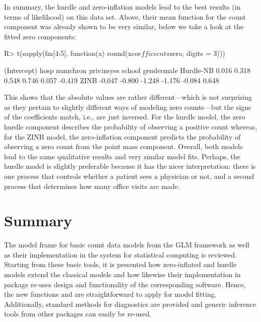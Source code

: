 \documentclass{Z}
\newcommand{\fct}[1]{\code{#1()}}
\begin{document}
In summary, the hurdle and zero-inflation models lead to the best 
results (in terms of likelihood) on this data set. Above, their mean function for the
count component was already shown to be very similar, below we take a
look at the fitted zero components:
\begin{Schunk}
\begin{Sinput}
R> t(sapply(fm[4:5], function(x) round(x$coefficients$zero, digits = 3)))
\end{Sinput}
\begin{Soutput}
          (Intercept)   hosp numchron privinsyes school gendermale
Hurdle-NB       0.016  0.318    0.548      0.746  0.057     -0.419
ZINB           -0.047 -0.800   -1.248     -1.176 -0.084      0.648
\end{Soutput}
\end{Schunk}
This shows that the absolute values are rather different---which is not
surprising as they pertain to slightly different ways of modeling zero
counts---but the signs of the coefficients match, i.e., are just inversed.
For the hurdle model, the zero hurdle component describes the probability
of observing a positive count whereas, for the ZINB model, the zero-inflation
component predicts the probability of observing a zero count from the
point mass component. Overall, both models lead to the same qualitative
results and very similar model fits. Perhaps, the hurdle model is slightly
preferable because it has the nicer interpretation: there is one process
that controls whether a patient sees a physician or not, and a second 
process that determines how many office visits are made.

\section{Summary} \label{sec:summary}

The model frame for basic count data models from the GLM framework as well
as their implementation in the  system for statistical computing
is reviewed. Starting from these basic tools, it is presented how
zero-inflated and hurdle models extend the classical models and how
likewise their  implementation in package  re-uses
design and functionality of the corresponding  software.
Hence, the new functions \fct{zeroinfl} and \fct{hurdle} are straightforward
to apply for model fitting. Additionally, standard methods for diagnostics 
are provided and generic inference tools from other packages can easily be
re-used.
\end{document}
